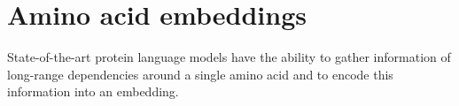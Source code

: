 \section{Amino acid embeddings}
State-of-the-art protein language models have the ability to gather information of long-range dependencies around a single amino acid and to encode this information into an embedding.